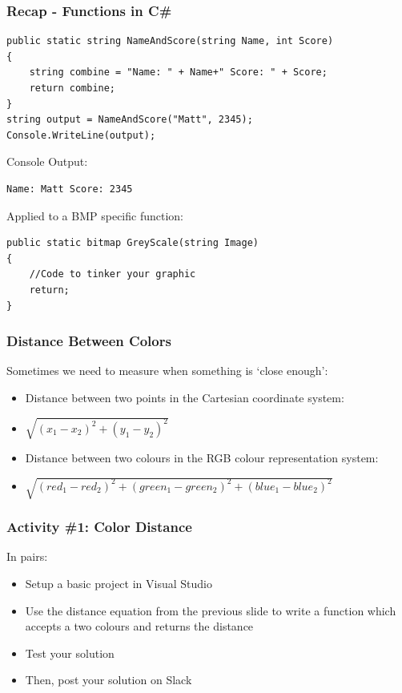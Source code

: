 \begin{frame}[fragile]
	\frametitle{Recap - Functions in C\#}
	
	\begin{lstlisting}
public static string NameAndScore(string Name, int Score) 
{
	string combine = "Name: " + Name+" Score: " + Score;
	return combine;
}		
string output = NameAndScore("Matt", 2345);	
Console.WriteLine(output);

	\end{lstlisting}
Console Output:
	\begin{lstlisting}
Name: Matt Score: 2345		

\end{lstlisting}
Applied to a BMP specific function:
	\begin{lstlisting}
public static bitmap GreyScale(string Image) 
{
	//Code to tinker your graphic
	return;
}	
\end{lstlisting}
	
\end{frame}

\begin{frame}
	\frametitle{Distance Between Colors}
	
	Sometimes we need to measure when something is `close enough':
	
	\begin{itemize}		
		\item Distance between two points in the Cartesian coordinate system:
		\item $\sqrt{(x_{1} - x_{2})^2 + (y_{1} - y_{2})^2}$
		\item Distance between two colours in the RGB colour representation system:
		\item $\sqrt{(red_{1} - red_{2})^2 + (green_{1} - green_{2})^2 + (blue_{1} - blue_{2})^2}$
	\end{itemize}
\end{frame}


\begin{frame}
	\frametitle{Activity \#1: Color Distance}
	
	In pairs:
	
	\vspace{2em}
	
	\begin{itemize}		
		\item Setup a basic project in Visual Studio
		\item Use the distance equation from the previous slide to write a function which accepts a two colours and returns the distance
		\item Test your solution
		\item Then, post your solution on Slack
	\end{itemize}
\end{frame}

